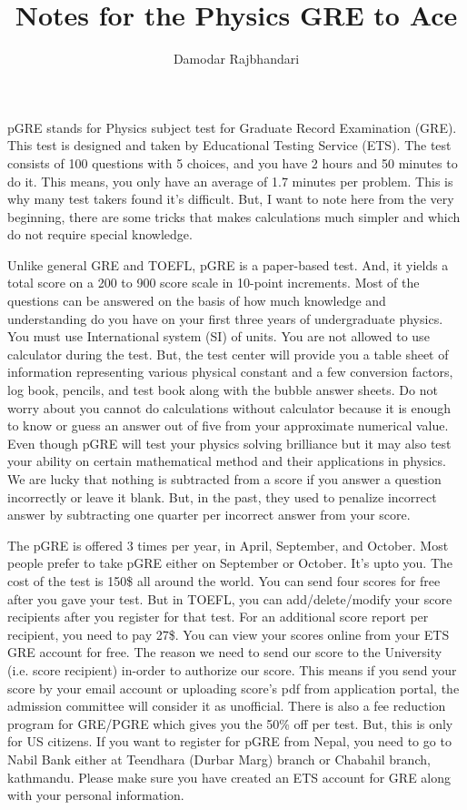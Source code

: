 \documentclass[12pt,a4paper]{article}
\title{Notes for the Physics GRE to Ace}
\author{Damodar Rajbhandari}
\begin{document}
\maketitle

\quad pGRE stands for Physics subject test for Graduate Record Examination (GRE). This test is designed and taken by Educational Testing Service (ETS). The test consists of 100 questions with 5 choices, and you have 2 hours and 50 minutes to do it. This means, you only have an average of 1.7 minutes per problem. This is why many test takers found it's difficult. But, I want to note here from the very beginning, there are some tricks that makes calculations much simpler and which do not require special knowledge. 

Unlike general GRE and TOEFL, pGRE is a paper-based test. And, it yields a total score on a 200 to 900 score scale in 10-point increments. Most of the questions can be answered on the basis of how much knowledge and understanding  do you have on your first three years of undergraduate physics. You must use International system (SI) of units. You are not allowed to use calculator during the test. But, the test center will provide you a table sheet of information representing various physical constant and a few conversion factors, log book, pencils, and test book along with the bubble answer sheets. Do not worry about you cannot do calculations without calculator because it is enough to know or guess an answer out of five from your approximate numerical value. Even though pGRE will test your physics solving brilliance but it may also test your ability on certain mathematical method and their applications in physics.  We are lucky that nothing is subtracted from a score if you answer a question incorrectly or leave it blank. But, in the past, they used to penalize incorrect answer by subtracting one quarter per incorrect answer from your score.

The pGRE is offered 3 times per year, in April, September, and October. Most people prefer to take pGRE either on September or October. It's upto you. The cost of the test is 150\$ all around the world. You can send four scores for free after you gave your test. But in TOEFL, you can add/delete/modify your score recipients after you register for that test. For an additional score report per recipient, you need to pay 27\$. You can view your scores online from your ETS GRE account for free. The reason we need to send our score to the University (i.e. score recipient) in-order to authorize our score. This means if you send your score by your email account or uploading score's pdf from application portal, the admission committee will consider it as unofficial. There is also a fee reduction program for GRE/PGRE which gives you the 50\% off per test. But, this is only for US citizens. If you want to register for pGRE from Nepal, you need to go to Nabil Bank either at Teendhara (Durbar Marg) branch or Chabahil branch, kathmandu. Please make sure you have created an ETS account for GRE along with your personal information.
\end{document}
